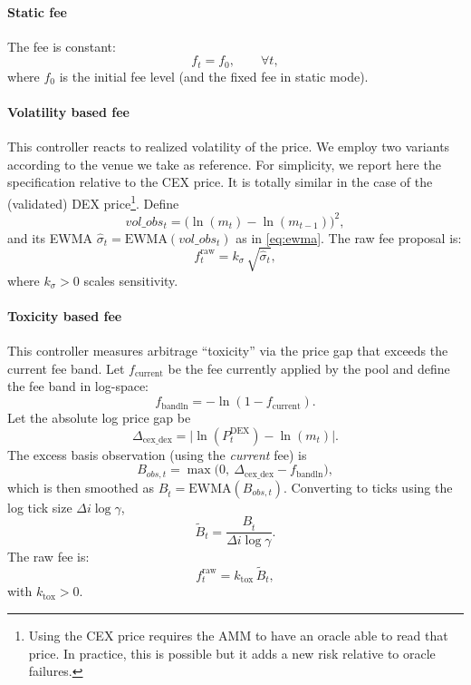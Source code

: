 \documentclass[11pt]{article}
\begin{document}
\paragraph{Static fee}
The fee is constant:
\begin{equation}
  f_t = f_0, \qquad \forall t,
  \label{eq:static-fee}
\end{equation}
where $f_0$ is the initial fee level (and the fixed fee in static mode).

\paragraph{Volatility based fee}
This controller reacts to realized volatility of the price. We employ two variants according to the venue we take as reference. For simplicity, we report here the specification relative to the CEX price. It is totally similar in the case of the (validated) DEX price\footnote{Using the CEX price requires the AMM to have an oracle able to read that price. In practice, this is possible but it adds a new risk relative to oracle failures.}.
Define 
\begin{equation}
  vol\_obs_t = \bigl(\ln(m_t) - \ln(m_{t-1})\bigr)^2,
\end{equation}
and its EWMA $\hat{\sigma}_t = \mathrm{EWMA}(vol\_obs_t)$ as in \eqref{eq:ewma}.
The raw fee proposal is:
\begin{equation}
  f^{\mathrm{raw}}_t = k_{\sigma}\, \sqrt{\hat{\sigma}_t},
  \label{eq:vol-fee}
\end{equation}
where $k_{\sigma}>0$ scales sensitivity.

\paragraph{Toxicity based fee}
This controller measures arbitrage ``toxicity'' via the price gap that exceeds the current fee band.
Let $f_{\mathrm{current}}$ be the fee currently applied by the pool and define the fee band in log-space:
\begin{equation}
  f_{\mathrm{band ln}} = -\ln(1-f_{\mathrm{current}}).
\end{equation}
Let the absolute log price gap be
\begin{equation}
      \Delta_{\mathrm{cex\_dex}} = \bigl|\ln(P^{\mathrm{DEX}}_t) - \ln(m_t)\bigr|.
\end{equation}
The excess basis observation (using the \emph{current} fee) is
\begin{equation}
  B_{obs,t} = \max\!\bigl(0,\ \Delta_{\mathrm{cex\_dex}} - f_{\mathrm{band ln}}\bigr),
  \label{eq:basis-obs}
\end{equation}
which is then smoothed as $B_{\hat{t}}=\mathrm{EWMA}(B_{obs,t})$.
Converting to ticks using the log tick size $\Delta i\log{\gamma}$,
\begin{equation}
  \tilde{B}_t = \frac{B_{\hat{t}}}{\Delta i\log{\gamma}}.
\end{equation}
The raw fee is:
\begin{equation}
  f^{\mathrm{raw}}_t = k_{\mathrm{tox}}\, \tilde{B}_t ,
  \label{eq:tox-fee}
\end{equation}
with $k_{\mathrm{tox}}>0$.
\end{document}
